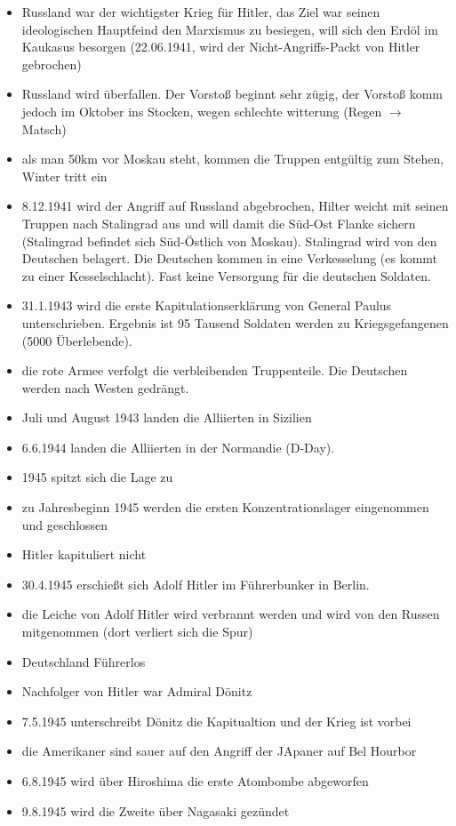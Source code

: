 \documentclass[a4paper,final]{book}
\begin{document}
	\begin{itemize}
	
	\item Russland war der wichtigster Krieg für Hitler, das Ziel war seinen ideologischen Hauptfeind den Marxismus zu besiegen, will sich den Erdöl im 		Kaukasus besorgen (22.06.1941, wird der Nicht-Angriffs-Packt von Hitler gebrochen)
	\item Russland wird überfallen. Der Vorstoß beginnt sehr zügig, der Vorstoß komm jedoch im Oktober ins Stocken, wegen schlechte witterung (Regen 			$\rightarrow$ Matsch)
	\item als man 50km vor Moskau steht, kommen die Truppen entgültig zum Stehen, Winter tritt ein
	\item 8.12.1941 wird der Angriff auf Russland abgebrochen, Hilter weicht mit seinen Truppen nach Stalingrad aus und will damit die Süd-Ost Flanke
	sichern (Stalingrad befindet sich Süd-Östlich von Moskau). Stalingrad wird von den Deutschen belagert. Die Deutschen kommen in eine Verkesselung
	(es kommt zu einer Kesselschlacht). Fast keine Versorgung für die deutschen Soldaten.
	\item 31.1.1943 wird die erste Kapitulationserklärung von General Paulus unterschrieben. Ergebnis ist 95 Tausend Soldaten werden zu Kriegsgefangenen
	(5000 Überlebende).
	\item die rote Armee verfolgt die verbleibenden Truppenteile. Die Deutschen werden nach Westen gedrängt.
	\item Juli und August 1943 landen die Alliierten in Sizilien
	\item 6.6.1944 landen die Alliierten in der Normandie (D-Day).
	\item 1945 spitzt sich die Lage zu
	\item zu Jahresbeginn 1945 werden die ersten Konzentrationslager eingenommen und geschlossen
	\item Hitler kapituliert nicht
	\item 30.4.1945 erschießt sich Adolf Hitler im Führerbunker in Berlin.
	\item die Leiche von Adolf Hitler wird verbrannt werden und wird von den Russen mitgenommen (dort verliert sich die Spur)
	\item Deutschland Führerlos
	\item Nachfolger  von Hitler war Admiral Dönitz
	\item 7.5.1945 unterschreibt Dönitz die Kapitualtion und der Krieg ist vorbei
	\item die Amerikaner sind sauer auf den Angriff der JApaner auf Bel Hourbor
	\item 6.8.1945 wird über Hiroshima die erste Atombombe abgeworfen
	\item 9.8.1945 wird die Zweite über Nagasaki gezündet
	

\end{itemize}
\end{document}
